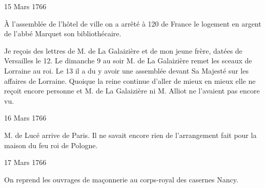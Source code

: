                      \begin{diary}{15 Mars 1766}{}

                         À l'assemblée de l'hôtel de ville on a
                           arrêté à 120 de France le logement en
                           argent de l'abbé Marquet son bibliothécaire. \bigskip


                         Je reçois des lettres de M. de La Galaizière et
                           de mon jeune frère, datées de Versailles
                           le 12. Le
                              dimanche 9 au soir M. de La Galaizière
                           remet les sceaux de Lorraine
                           au roi.
                           Le 13 il a du y avoir une
                           assemblée devant
                           Sa Majesté sur les affaires de Lorraine.
                           Quoique la reine
                           continue d'aller de mieux
                           en mieux elle ne reçoit encore personne
                           et M. de La Galaizière ni M. Alliot
                           ne l'avaient
                           pas encore vu. \bigskip


                     \end{diary}

                     \begin{diary}{16 Mars 1766}{}


                           M. de Lucé arrive de Paris. Il ne savait
                           encore rien de l'arrangement fait pour la
                           maison du feu roi de Pologne. \bigskip


                     \end{diary}

                     \begin{diary}{17 Mars 1766}{}

                         On reprend les ouvrages de maçonnerie
                           au corps-royal des casernes Nancy. \bigskip


                     \end{diary}

